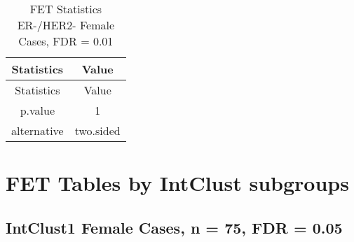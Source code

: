 \documentclass[]{article}
\begin{document}
\begin{longtable}[]{@{}cc@{}}
\caption{FET Statistics ER-/HER2- Female Cases, FDR =
0.01}\tabularnewline
\toprule
\begin{minipage}[b]{0.18\columnwidth}\centering\strut
Statistics\strut
\end{minipage} & \begin{minipage}[b]{0.14\columnwidth}\centering\strut
Value\strut
\end{minipage}\tabularnewline
\midrule
\endfirsthead
\toprule
\begin{minipage}[b]{0.18\columnwidth}\centering\strut
Statistics\strut
\end{minipage} & \begin{minipage}[b]{0.14\columnwidth}\centering\strut
Value\strut
\end{minipage}\tabularnewline
\midrule
\endhead
\begin{minipage}[t]{0.18\columnwidth}\centering\strut
p.value\strut
\end{minipage} & \begin{minipage}[t]{0.14\columnwidth}\centering\strut
1\strut
\end{minipage}\tabularnewline
\begin{minipage}[t]{0.18\columnwidth}\centering\strut
alternative\strut
\end{minipage} & \begin{minipage}[t]{0.14\columnwidth}\centering\strut
two.sided\strut
\end{minipage}\tabularnewline
\bottomrule
\end{longtable}

\pagebreak

\section{FET Tables by IntClust
subgroups}\label{fet-tables-by-intclust-subgroups}

\subsection{IntClust1 Female Cases, n = 75, FDR =
0.05}\label{intclust1-female-cases-n-75-fdr-0.05}
\end{document}
